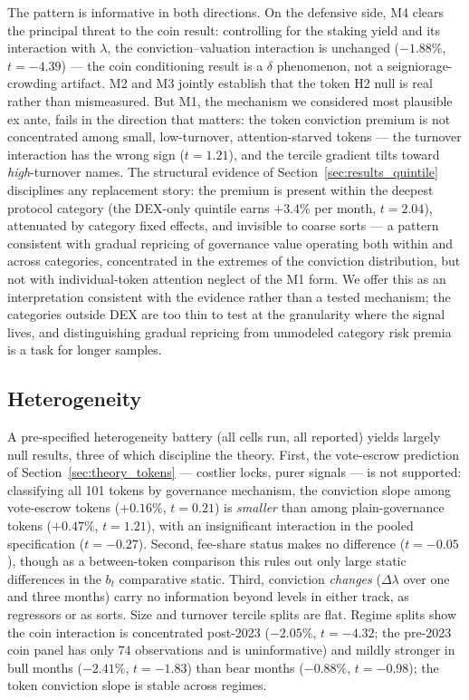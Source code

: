 \documentclass[12pt]{article}
\begin{document}
The pattern is informative in both directions. On the defensive side, M4 clears the
principal threat to the coin result: controlling for the staking yield and its
interaction with $\lambda$, the conviction--valuation interaction is unchanged
($-1.88\%$, $t=-4.39$) --- the coin conditioning result is a $\delta$ phenomenon, not
a seigniorage-crowding artifact. M2 and M3 jointly establish that the token H2 null is
real rather than mismeasured. But M1, the mechanism we considered most plausible ex
ante, fails in the direction that matters: the token conviction premium is not
concentrated among small, low-turnover, attention-starved tokens --- the turnover
interaction has the wrong sign ($t=1.21$), and the tercile gradient tilts toward
\textit{high}-turnover names. The structural evidence of
Section~\ref{sec:results_quintile} disciplines any replacement story: the premium is
present within the deepest protocol category (the DEX-only quintile earns $+3.4\%$ per
month, $t=2.04$), attenuated by category fixed effects, and invisible to coarse sorts
--- a pattern consistent with gradual repricing of governance value operating both
within and across categories, concentrated in the extremes of the conviction
distribution, but not with individual-token attention neglect of the M1 form. We offer
this as an interpretation consistent with the evidence rather than a tested mechanism;
the categories outside DEX are too thin to test at the granularity where the signal
lives, and distinguishing gradual repricing from unmodeled category risk premia is a
task for longer samples.

\FloatBarrier
\subsection{Heterogeneity}
\label{sec:robust_het}

A pre-specified heterogeneity battery (all cells run, all reported) yields largely
null results, three of which discipline the theory. First, the vote-escrow
prediction of Section~\ref{sec:theory_tokens} --- costlier locks, purer signals ---
is not supported: classifying all 101 tokens by governance mechanism, the conviction
slope among vote-escrow tokens ($+0.16\%$, $t=0.21$) is \textit{smaller} than among
plain-governance tokens ($+0.47\%$, $t=1.21$), with an insignificant interaction in
the pooled specification ($t=-0.27$). Second, fee-share status makes no difference
($t=-0.05$), though as a between-token comparison this rules out only large static
differences in the $b_t$ comparative static. Third, conviction \textit{changes}
($\Delta\lambda$ over one and three months) carry no information beyond levels in
either track, as regressors or as sorts. Size and turnover tercile splits are flat.
Regime splits show the coin interaction is concentrated post-2023 ($-2.05\%$,
$t=-4.32$; the pre-2023 coin panel has only 74 observations and is uninformative)
and mildly stronger in bull months ($-2.41\%$, $t=-1.83$) than bear months
($-0.88\%$, $t=-0.98$); the token conviction slope is stable across regimes.
\end{document}
